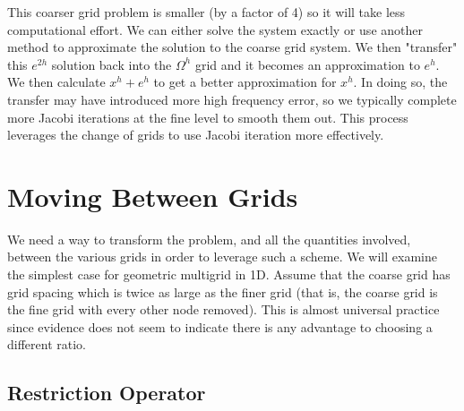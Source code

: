 \documentclass[11pt]{article}
\begin{document}
This coarser grid problem is smaller (by a factor of 4) so it will take
less computational effort. We can either solve the system exactly or use
another method to approximate the solution to the coarse grid system. We
then "transfer" this $e^{2h}$ solution back into the \(\Omega^h\) grid and it becomes an
approximation to \(e^h\). We then calculate \(x^h + e^h\) to get a
better approximation for \(x^h\). In doing so, the transfer may have
introduced more high frequency error, so we typically complete more
Jacobi iterations at the fine level to smooth them out. This process
leverages the change of grids to use Jacobi iteration more effectively.

    \hypertarget{moving-between-grids}{%
\section{Moving Between Grids}\label{moving-between-grids}}

We need a way to transform the problem, and all the quantities involved,
between the various grids in order to leverage such a scheme. We will
examine the simplest case for geometric multigrid in 1D. Assume that the
coarse grid has grid spacing which is twice as large as the finer grid
(that is, the coarse grid is the fine grid with every other node
removed). This is almost universal practice since evidence does not seem
to indicate there is any advantage to choosing a different ratio.

    \hypertarget{restriction-operator}{%
\subsection{Restriction Operator}\label{restriction-operator}}
\end{document}
